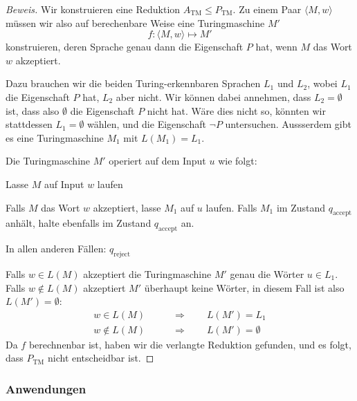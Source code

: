 \begin{proof}[Beweis]
Wir konstruieren eine Reduktion $A_\text{TM}\le P_{\text{TM}}$.
Zu einem Paar
$\langle M,w\rangle$
müssen wir also auf
berechenbare Weise eine Turingmaschine $M'$
\[
f\colon \langle M,w\rangle\mapsto M'
\]
konstruieren, deren Sprache genau dann die Eigenschaft $P$
hat, wenn $M$ das Wort $w$ akzeptiert.

Dazu brauchen wir die beiden Turing-erkennbaren Sprachen $L_1$ und $L_2$,
wobei $L_1$ die Eigenschaft $P$ hat, $L_2$ aber nicht.
Wir können dabei annehmen, dass $L_2=\emptyset$ ist, dass also
$\emptyset$ die Eigenschaft $P$ nicht hat.
Wäre dies nicht so, könnten
wir stattdessen $L_1=\emptyset$  wählen, und die Eigenschaft $\neg P$
untersuchen.
Aussserdem gibt es eine Turingmaschine $M_1$ mit $L(M_1)=L_1$.

Die Turingmaschine $M'$ operiert auf dem Input $u$ wie folgt:
\medskip
\begin{compactenum}
\item Lasse $M$ auf Input $w$ laufen
\item Falls $M$ das Wort $w$ akzeptiert, lasse $M_1$ auf $u$ laufen.
Falls $M_1$ im Zustand $q_{\text{accept}}$ anhält, halte ebenfalls
im Zustand $q_{\text{accept}}$ an.
\item In allen anderen Fällen: $q_{\text{reject}}$
\end{compactenum}
\medskip

Falls $w\in L(M)$ akzeptiert die Turingmaschine $M'$ genau die Wörter
$u\in L_1$.
Falls $w\not\in L(M)$ akzeptiert $M'$ überhaupt keine
Wörter, in diesem Fall ist also $L(M')=\emptyset$:
\begin{align*}
w\in L(M)&\qquad \Rightarrow\qquad L(M')=L_1\\
w\not\in L(M)&\qquad \Rightarrow\qquad L(M')=\emptyset
\end{align*}
Da $f$ berechnenbar ist, haben wir die verlangte Reduktion
gefunden, und es folgt, dass $P_{\text{TM}}$ nicht
entscheidbar ist.
\end{proof}

\subsubsection{Anwendungen}

